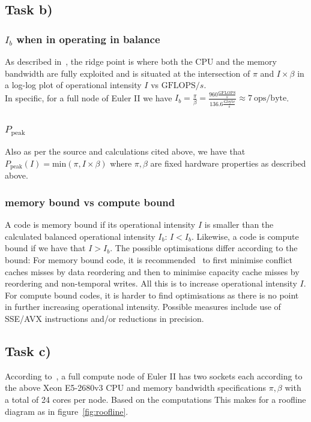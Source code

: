 \documentclass[11pt,a4paper]{article}
\begin{document}
\subsection{Task b)}
\subsubsection{$I_b$ when in operating in balance}
As described in~\cite{kou}, the ridge point is where both the CPU and the memory bandwidth are fully exploited and is situated at the intersection of $\pi$ and $I \times \beta$ in a log-log plot of operational intensity $I$ vs $\text{GFLOPS}/s$.\\
In specific, for a full node of Euler II we have $I_b = \frac{\pi}{\beta} = \frac{960 \frac{\text{GFLOPS}}{s}}{136.6\frac{\text{Gbyte}}{s}} \approx 7 \: \text{ops/byte}$.

\subsubsection{$P_{\text{peak}}$}
Also as per the source and calculations cited above, we have that $P_{\text{peak}}(I) = \text{min}(\pi, I\times \beta)$ where $\pi, \beta$ are fixed hardware properties as described above.

\subsubsection{memory bound vs compute bound}
A code is memory bound if its operational intensity $I$ is smaller than the calculated balanced operational intensity $I_b$: $I < I_b$. Likewise, a code is compute bound if we have that $I > I_b$.
The possible optimisations differ according to the bound: For memory bound code, it is recommended~\cite{kou} to first minimise conflict caches misses by data reordering and then to minimise capacity cache misses by reordering and non-temporal writes. All this is to increase operational intensity $I$.\\
For compute bound codes, it is harder to find optimisations as there is no point in further increasing operational intensity. Possible measures include use of SSE/AVX instructions and/or reductions in precision.

\subsection{Task c)}
According to~\cite{euler}, a full compute node of Euler II has two sockets each according to the above Xeon E5-2680v3 CPU and memory bandwidth specifications $\pi, \beta$ with a total of 24 cores per node. Based on the computations This makes for a roofline diagram as in figure~\ref{fig:roofline}.
\end{document}
